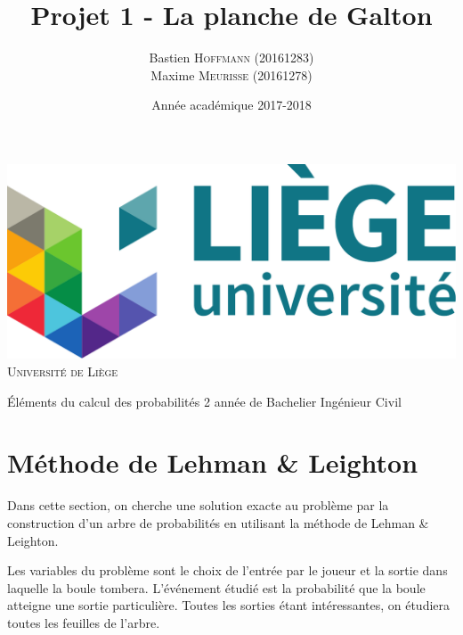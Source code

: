 \documentclass[a4paper, 12pt]{article}
\title{Projet 1 - La planche de Galton}
\author{
	Bastien \textsc{Hoffmann} (20161283)\\Maxime \textsc{Meurisse} (20161278)\\
}
\date{Année académique 2017-2018}
\newcommand{\subtitle}{Éléments du calcul des probabilités}
\newcommand{\context}{2\ieme{} année de Bachelier Ingénieur Civil}
\begin{document}
	\makeatletter
	\begin{titlepage}
		\begin{minipage}[t][0.425\textheight][t]{\textwidth}
			\begin{center}
				\includegraphics[height=0.15\textheight]{resources/pdf/logo-uliege.pdf}
				\vfill
				{\huge \textsc{Université de Liège}}
				\vfill
			\end{center}
		\end{minipage}
		\vfill
		\begin{minipage}{\textwidth}
			\hspace{6pt}
			\begin{mdframed}[linewidth = 2pt, innertopmargin = 12pt, innerbottommargin = 12pt, leftline = false, rightline = false]
				\begin{center}
					{\huge \bfseries \@title}
				\end{center}
			\end{mdframed}
			\hspace{6pt}
		\end{minipage}
		\vfill
		\begin{minipage}[b][0.425\textheight][t]{\textwidth}
			\begin{center}
				{\LARGE \subtitle}
				\vfill
				{\large \@author\space}
				\vfill
				{\large \context \\[6pt] \@date}
			\end{center}
		\end{minipage}
	\end{titlepage}
	\makeatother
	\restoregeometry
	\section{Méthode de Lehman \& Leighton}
	Dans cette section, on cherche une solution exacte au problème par la construction d'un arbre de probabilités en utilisant la méthode de Lehman \& Leighton.\par
	Les variables du problème sont le choix de l'entrée par le joueur et la sortie dans laquelle la boule tombera. L'événement étudié est la probabilité que la boule atteigne une sortie particulière. Toutes les sorties étant intéressantes, on étudiera toutes les feuilles de l'arbre.
\end{document}
